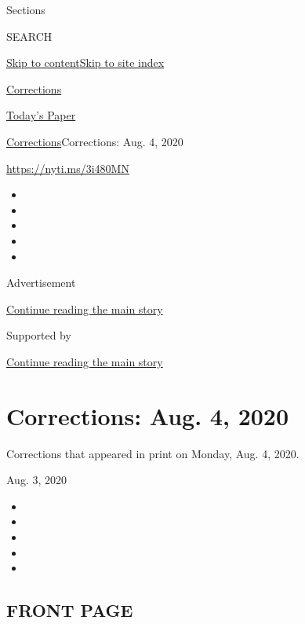 Sections

SEARCH

\protect\hyperlink{site-content}{Skip to
content}\protect\hyperlink{site-index}{Skip to site index}

\href{https://www.nytimes3xbfgragh.onion/section/corrections}{Corrections}

\href{https://myaccount.nytimes3xbfgragh.onion/auth/login?response_type=cookie\&client_id=vi}{}

\href{https://www.nytimes3xbfgragh.onion/section/todayspaper}{Today's
Paper}

\href{/section/corrections}{Corrections}\textbar{}Corrections: Aug. 4,
2020

\url{https://nyti.ms/3i480MN}

\begin{itemize}
\item
\item
\item
\item
\item
\end{itemize}

Advertisement

\protect\hyperlink{after-top}{Continue reading the main story}

Supported by

\protect\hyperlink{after-sponsor}{Continue reading the main story}

\hypertarget{corrections-aug-4-2020}{%
\section{Corrections: Aug. 4, 2020}\label{corrections-aug-4-2020}}

Corrections that appeared in print on Monday, Aug. 4, 2020.

Aug. 3, 2020

\begin{itemize}
\item
\item
\item
\item
\item
\end{itemize}

\hypertarget{front-page}{%
\subsection{FRONT PAGE}\label{front-page}}

